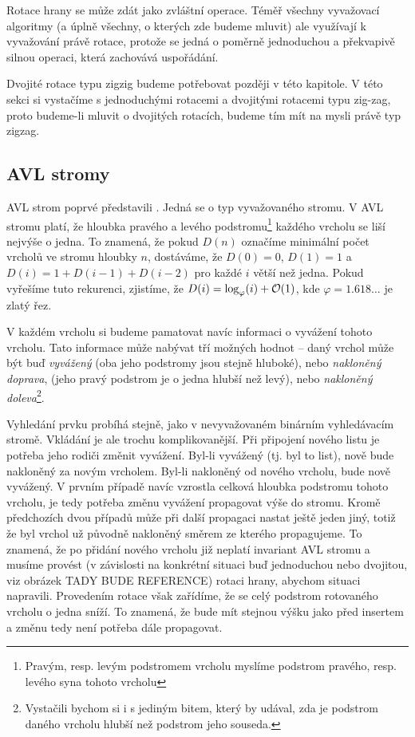 Rotace hrany se může zdát jako zvláštní operace. Téměř všechny vyvažovací algoritmy (a úplně všechny, o kterých zde budeme mluvit) ale využívají k vyvažování právě rotace, protože se jedná o poměrně jednoduchou a překvapivě silnou operaci, která zachovává uspořádání.

Dvojité rotace typu zigzig budeme potřebovat později v této kapitole. V této
sekci si vystačíme s jednoduchými rotacemi a dvojitými rotacemi typu zig-zag,
proto budeme-li mluvit o dvojitých rotacích, budeme tím mít na mysli právě typ
zigzag.

\subsection{AVL stromy}

AVL strom poprvé představili \citet{AVL}. Jedná se o typ vyvažovaného stromu. V
AVL stromu platí, že hloubka pravého a levého podstromu\footnote{Pravým, resp. levým podstromem vrcholu myslíme podstrom pravého, resp. levého syna tohoto vrcholu} každého vrcholu se liší
nejvýše o jedna. To znamená, že pokud $D(n)$ označíme minimální počet vrcholů
ve stromu hloubky $n$, dostáváme, že $D(0)=0$, $D(1)=1$ a
$D(i)=1+D(i-1)+D(i-2)$ pro každé $i$ větší než jedna. Pokud vyřešíme tuto
rekurenci, zjistíme, že $D(i)=\log_\varphi(i) + \mathcal O(1)$, kde $\varphi = 1.618\dots$ je zlatý
řez.

V každém vrcholu si budeme pamatovat navíc informaci o vyvážení tohoto vrcholu.
Tato informace může nabývat tří možných hodnot -- daný vrchol může být buď
\emph{vyvážený} (oba jeho podstromy jsou stejně hluboké), nebo \emph{nakloněný
doprava}, (jeho pravý podstrom je o jedna hlubší než levý), nebo
\emph{nakloněný doleva}\footnote{Vystačili bychom si i s jediným bitem, který by udával, zda je podstrom daného vrcholu hlubší než podstrom jeho souseda.}.

Vyhledání prvku probíhá stejně, jako v nevyvažovaném binárním vyhledávacím stromě. 
Vkládání je ale trochu komplikovanější. Při připojení nového listu je potřeba
jeho rodiči změnit vyvážení. Byl-li vyvážený (tj. byl to list), nově bude
nakloněný za novým vrcholem. Byl-li nakloněný od nového vrcholu, bude nově
vyvážený. V prvním případě navíc vzrostla celková hloubka podstromu tohoto
vrcholu, je tedy potřeba změnu vyvážení propagovat výše do stromu. Kromě
předchozích dvou případů  může při další propagaci nastat ještě jeden jiný,
totiž že byl vrchol už původně nakloněný směrem ze kterého propagujeme. To
znamená, že po přidání nového vrcholu již neplatí invariant AVL stromu a musíme
provést (v závislosti na konkrétní situaci buď jednoduchou nebo dvojitou, viz
obrázek TADY BUDE REFERENCE) rotaci hrany, abychom situaci napravili.
Provedením rotace však zařídíme, že se celý podstrom rotovaného vrcholu o jedna
sníží. To znamená, že bude mít stejnou výšku jako před insertem a změnu tedy
není potřeba dále propagovat.   

